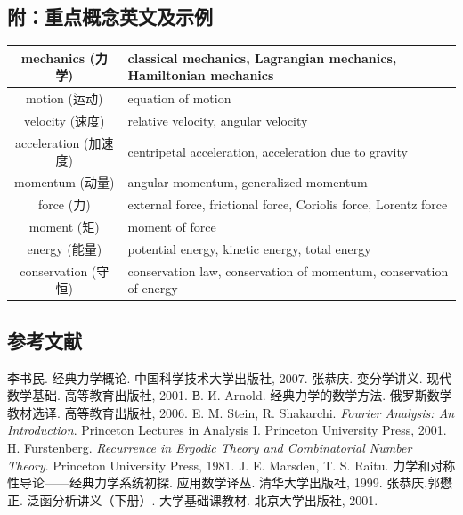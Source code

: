 \subsection*{附：重点概念英文及示例}
\begin{center}
\begin{tabular}{|c|l|}
    \hline mechanics (力学) & classical mechanics, Lagrangian mechanics, Hamiltonian mechanics \\
    \hline motion (运动) & equation of motion \\
    \hline velocity (速度) & relative velocity, angular velocity \\ 
    \hline acceleration (加速度) & centripetal acceleration, acceleration due to gravity \\ 
    \hline momentum (动量) & angular momentum, generalized momentum \\
    \hline force (力) & external force, frictional force, Coriolis force, Lorentz force \\
    \hline moment (矩) & moment of force \\ 
    \hline energy (能量) & potential energy, kinetic energy, total energy \\ 
    \hline conservation (守恒) & conservation law, conservation of momentum, conservation of energy 
\end{tabular}
\end{center}

\subsection*{参考文献}
\begin{references}
        李书民. 经典力学概论. 中国科学技术大学出版社, 2007.
        张恭庆. 变分学讲义. 现代数学基础. 高等教育出版社, 2001.
        В. И. Arnold. 经典力学的数学方法. 俄罗斯数学教材选译. 高等教育出版社, 2006.
        E. M. Stein, R. Shakarchi. \textit{Fourier Analysis: An Introduction}. 
        Princeton Lectures in Analysis I. Princeton University Press, 2001.
        H. Furstenberg. \textit{Recurrence in Ergodic Theory and Combinatorial Number Theory}. 
        Princeton University Press, 1981.
        J. E. Marsden, T. S. Raitu. 力学和对称性导论——经典力学系统初探. 
        应用数学译丛. 清华大学出版社, 1999.
        张恭庆,郭懋正. 泛函分析讲义（下册）. 大学基础课教材. 北京大学出版社, 2001.
\end{references}